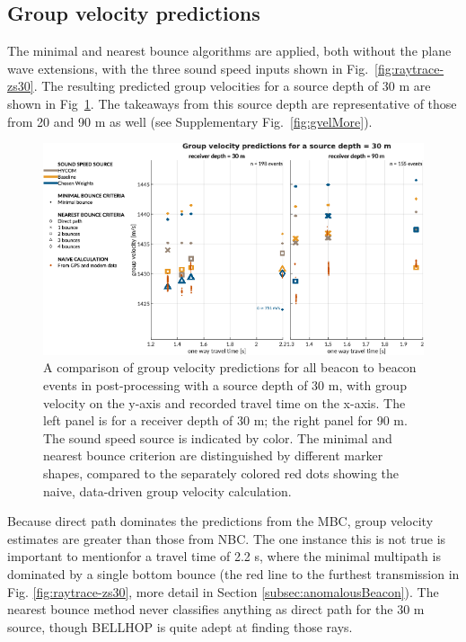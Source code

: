 \FloatBarrier
\subsection{Group velocity predictions}

The minimal and nearest bounce algorithms are applied, both without the plane wave extensions, with the three sound speed inputs shown in Fig.~\ref{fig:raytrace-zs30}.
The resulting predicted group velocities for a source depth of 30 m are shown in Fig~\ref{fig:gvel30}.
The takeaways from this source depth are representative of those from 20 and 90 m as well (see Supplementary Fig.~\ref{fig:gvelMore}).

\begin{figure}[h!]
\includegraphics[width=\columnwidth]{figs/Fig5.pdf}
\caption{A comparison of group velocity predictions for all beacon to beacon events in post-processing with a source depth of 30 m, with group velocity on the y-axis and recorded travel time on the x-axis. The left panel is for a receiver depth of 30 m; the right panel for 90 m. The sound speed source is indicated by color. The minimal and nearest bounce criterion are distinguished by different marker shapes, compared to the separately colored red dots showing the naive, data-driven group velocity calculation.}
\label{fig:gvel30}
\end{figure}

Because direct path dominates the predictions from the MBC, group velocity estimates are greater than those from NBC.
The one instance this is not true is important to mention\textemdash for a travel time of 2.2 s, where the minimal multipath is dominated by a single bottom bounce (the red line to the furthest transmission in Fig. \ref{fig:raytrace-zs30}, more detail in Section \ref{subsec:anomalousBeacon}).
The nearest bounce method never classifies anything as direct path for the 30 m source, though BELLHOP is quite adept at finding those rays. 

